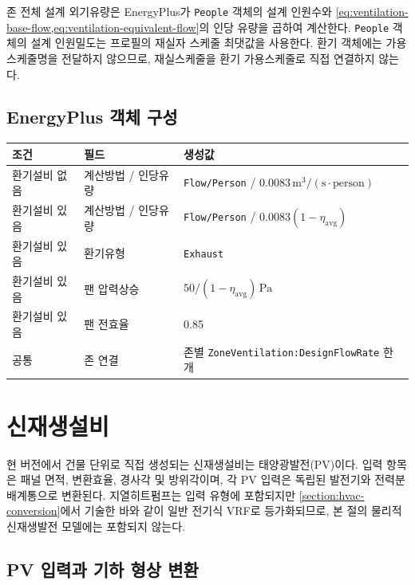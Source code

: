 존 전체 설계 외기유량은 EnergyPlus가 \texttt{People} 객체의 설계 인원수와 \cref{eq:ventilation-base-flow,eq:ventilation-equivalent-flow}의 인당 유량을 곱하여 계산한다. \texttt{People} 객체의 설계 인원밀도는 프로필의 재실자 스케줄 최댓값을 사용한다. 환기 객체에는 가용스케줄명을 전달하지 않으므로,  재실스케줄을 환기 가용스케줄로 직접 연결하지 않는다.

\subsection{EnergyPlus 객체 구성}

\begin{defaulttable}
  \caption{환기 입력에 따른 EnergyPlus 객체 필드}
  \label{tab:ventilation-object-mapping}
  \small
  \begin{tabularx}{\textwidth}{p{3.0cm}p{3.2cm}X}
    \toprule
    조건 & 필드 & 생성값 \\ \midrule
    환기설비 없음 & 계산방법 / 인당유량 & \texttt{Flow/Person} / $0.0083\,\mathrm{m^3/(s\cdot person)}$ \\
    환기설비 있음 & 계산방법 / 인당유량 & \texttt{Flow/Person} / $0.0083(1-\eta_{\mathrm{avg}})$ \\
    환기설비 있음 & 환기유형 & \texttt{Exhaust} \\
    환기설비 있음 & 팬 압력상승 & $50/(1-\eta_{\mathrm{avg}})\,\mathrm{Pa}$ \\
    환기설비 있음 & 팬 전효율 & 0.85 \\
    공통 & 존 연결 & 존별 \texttt{ZoneVentilation:DesignFlowRate} 한 개 \\ \bottomrule
  \end{tabularx}
\end{defaulttable}

\section{신재생설비}
\label{section:renewable-conversion}

현 버전에서 건물 단위로 직접 생성되는 신재생설비는 태양광발전(PV)이다. 입력 항목은 패널 면적, 변환효율, 경사각 및 방위각이며, 각 PV 입력은 독립된 발전기와 전력분배계통으로 변환된다. 지열히트펌프는 입력 유형에 포함되지만 \cref{section:hvac-conversion}에서 기술한 바와 같이 일반 전기식 VRF로 등가화되므로, 본 절의 물리적 신재생발전 모델에는 포함되지 않는다.

\subsection{PV 입력과 기하 형상 변환}

